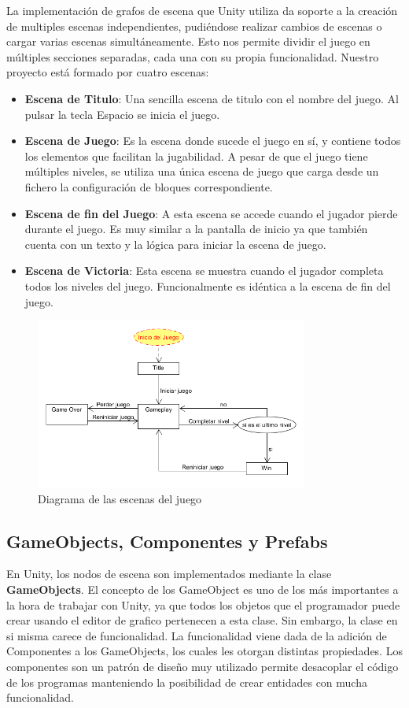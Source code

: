 La implementación de grafos de escena que Unity utiliza da soporte a la creación de multiples escenas independientes, pudiéndose realizar cambios de escenas o cargar varias escenas simultáneamente. Esto nos permite dividir el juego en múltiples secciones separadas, cada una con su propia funcionalidad. Nuestro proyecto está formado por cuatro escenas:
\begin{itemize}
  \item \textbf{Escena de Titulo}: Una sencilla escena de titulo con el nombre del juego. Al pulsar la tecla Espacio se inicia el juego.
  \item \textbf{Escena de Juego}: Es la escena donde sucede el juego en sí, y contiene todos los elementos que facilitan la jugabilidad. A pesar de que el juego tiene múltiples niveles, se utiliza una única escena de juego que carga desde un fichero la configuración de bloques correspondiente.
  \item \textbf{Escena de fin del Juego}: A esta escena se accede cuando el jugador pierde durante el juego. Es muy similar a la pantalla de inicio ya que también cuenta con un texto y la lógica para iniciar la escena de juego.
  \item \textbf{Escena de Victoria}: Esta escena se muestra cuando el jugador completa todos los niveles del juego. Funcionalmente es idéntica a la escena de fin del juego.
  \end{itemize}
\begin{figure}[h]
	\includegraphics[width=0.8\textwidth]{images/estructura/clases/scenes}
	\centering
	\caption{Diagrama de las escenas del juego}
\end{figure}
  
\subsection{GameObjects, Componentes y Prefabs}
En Unity, los nodos de escena son implementados mediante la clase \textbf{GameObjects}. El concepto de los GameObject es uno de los más importantes a la hora de trabajar con Unity\cite{unity_manual}, ya que todos los objetos que el programador puede crear usando el editor de grafico pertenecen a esta clase. Sin embargo, la clase en si misma carece de funcionalidad. La funcionalidad viene dada de la adición de Componentes a los GameObjects, los cuales les otorgan distintas propiedades. Los componentes son un patrón de diseño muy utilizado permite desacoplar el código de los programas manteniendo la posibilidad de crear entidades con mucha funcionalidad\cite{game_programming_patterns}.

